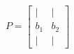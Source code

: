 \documentclass[preview]{standalone}
\begin{document}
\begin{align*}
P = \begin{bmatrix} | & | \\ b_1 & b_2 \\ | & | \end{bmatrix}
\end{align*}
\end{document}
